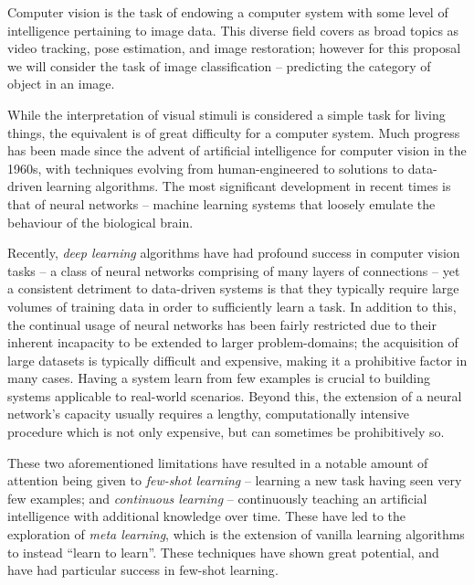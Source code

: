 \documentclass{report}
\begin{document}
	Computer vision is the task of endowing a computer system with some level of intelligence pertaining to image data. This diverse field covers as broad topics as video tracking, pose estimation, and image restoration; however for this proposal we will consider the task of image classification -- predicting the category of object in an image. \par
	While the interpretation of visual stimuli is considered a simple task for living things, the equivalent is of great difficulty for a computer system. Much progress has been made since the advent of artificial intelligence for computer vision in the 1960s, with techniques evolving from human-engineered to solutions to data-driven learning algorithms. The most significant development in recent times is that of neural networks -- machine learning systems that loosely emulate the behaviour of the biological brain. \par
	Recently, \emph{deep learning} algorithms have had profound success in computer vision tasks --  a class of neural networks comprising of many layers of connections -- yet a consistent detriment to data-driven systems is that they typically require large volumes of training data in order to sufficiently learn a task. In addition to this, the continual usage of neural networks has been fairly restricted due to their inherent incapacity to be extended to larger problem-domains; the acquisition of large datasets is typically difficult and expensive, making it a prohibitive factor in many cases. Having a system learn from few examples is crucial to building systems applicable to real-world scenarios. Beyond this, the extension of a neural network's capacity usually requires a lengthy, computationally intensive procedure which is not only expensive, but can sometimes be prohibitively so. \par
	These two aforementioned limitations have resulted in a notable amount of attention being given to \emph{few-shot learning}\parencite{maml}\parencite{relationnet} -- learning a new task having seen very few examples; and  \emph{continuous learning}\parencite{lwf}\parencite{ewc}\parencite{hat} -- continuously teaching an artificial intelligence with additional knowledge over time. These have led to the exploration of \emph{meta learning}\parencite{lotsag}\parencite{maml}\parencite{reptile}\parencite{mlwtc}, which is the extension of vanilla learning algorithms to instead ``learn to learn''. These techniques have shown great potential, and have had particular success in few-shot learning\parencite{maml}\parencite{matching}\parencite{mlwtc}. \par
\end{document}
